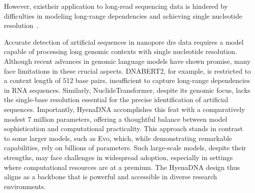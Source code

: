 \documentclass[pdflatex,sn-nature, lineno]{sn-jnl}%
\theoremstyle{thmstyleone}%
\theoremstyle{thmstyletwo}%
\theoremstyle{thmstylethree}%
\begin{document}
However, existheir application to long-read sequencing data is hindered by difficulties in modeling long-range dependencies and achieving single nucleotide resolution~\cite{dalla2023nucleotide, tay2022efficient, zhou2023dnabert2}.


Accurate detection of artificial sequences in nanopore \gls{drs} data requires a model capable of processing long genomic contexts with single nucleotide resolution. 
Although recent advances in genomic language models have shown promise, many face limitations in these crucial aspects. DNABERT2\cite{zhou2023dnabert2}, for example, is restricted to a context length of 512 base pairs, insufficient to capture long-range dependencies in RNA sequences.
Similarly, NuclideTransformer\cite{dalla2023nucleotide}, despite its genomic focus, lacks the single-base resolution essential for the precise identification of artificial sequences.
Importantly, HyenaDNA accomplishes this feat with a comparatively modest 7 million parameters, offering a thoughtful balance between model sophistication and computational practicality.
This approach stands in contrast to some larger models, such as Evo\cite{nguyen2024sequence}, which, while demonstrating remarkable capabilities, rely on billions of parameters.
Such large-scale models, despite their strengths, may face challenges in widespread adoption, especially in settings where computational resources are at a premium.
The HyenaDNA design thus aligns as a backbone that is powerful and accessible in diverse research environments.
\end{document}
